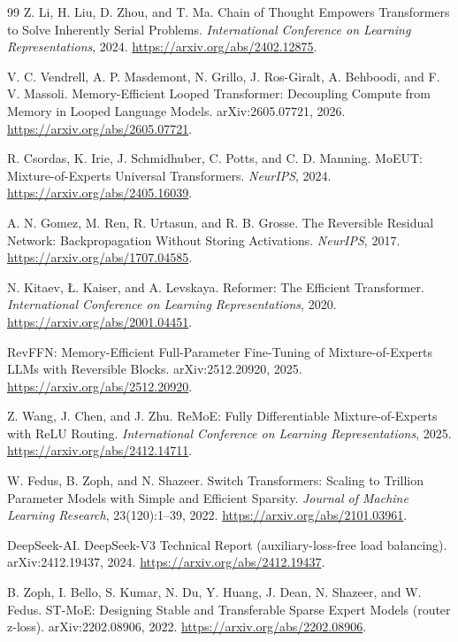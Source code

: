 \documentclass[11pt]{article}
\begin{document}
\begin{thebibliography}{99}
Z. Li, H. Liu, D. Zhou, and T. Ma.
\newblock Chain of Thought Empowers Transformers to Solve Inherently Serial Problems.
\newblock \emph{International Conference on Learning Representations}, 2024.
\newblock \url{https://arxiv.org/abs/2402.12875}.

V. C. Vendrell, A. P. Masdemont, N. Grillo, J. Ros-Giralt, A. Behboodi, and
F. V. Massoli.
\newblock Memory-Efficient Looped Transformer: Decoupling Compute from Memory in Looped Language Models.
\newblock arXiv:2605.07721, 2026.
\newblock \url{https://arxiv.org/abs/2605.07721}.

R. Csordas, K. Irie, J. Schmidhuber, C. Potts, and C. D. Manning.
\newblock MoEUT: Mixture-of-Experts Universal Transformers.
\newblock \emph{NeurIPS}, 2024.
\newblock \url{https://arxiv.org/abs/2405.16039}.

A. N. Gomez, M. Ren, R. Urtasun, and R. B. Grosse.
\newblock The Reversible Residual Network: Backpropagation Without Storing Activations.
\newblock \emph{NeurIPS}, 2017.
\newblock \url{https://arxiv.org/abs/1707.04585}.

N. Kitaev, {\L}. Kaiser, and A. Levskaya.
\newblock Reformer: The Efficient Transformer.
\newblock \emph{International Conference on Learning Representations}, 2020.
\newblock \url{https://arxiv.org/abs/2001.04451}.

RevFFN: Memory-Efficient Full-Parameter Fine-Tuning of Mixture-of-Experts LLMs with Reversible Blocks.
\newblock arXiv:2512.20920, 2025.
\newblock \url{https://arxiv.org/abs/2512.20920}.

Z. Wang, J. Chen, and J. Zhu.
\newblock ReMoE: Fully Differentiable Mixture-of-Experts with ReLU Routing.
\newblock \emph{International Conference on Learning Representations}, 2025.
\newblock \url{https://arxiv.org/abs/2412.14711}.

W. Fedus, B. Zoph, and N. Shazeer.
\newblock Switch Transformers: Scaling to Trillion Parameter Models with Simple and Efficient Sparsity.
\newblock \emph{Journal of Machine Learning Research}, 23(120):1--39, 2022.
\newblock \url{https://arxiv.org/abs/2101.03961}.

DeepSeek-AI.
\newblock DeepSeek-V3 Technical Report (auxiliary-loss-free load balancing).
\newblock arXiv:2412.19437, 2024.
\newblock \url{https://arxiv.org/abs/2412.19437}.

B. Zoph, I. Bello, S. Kumar, N. Du, Y. Huang, J. Dean, N. Shazeer, and W. Fedus.
\newblock ST-MoE: Designing Stable and Transferable Sparse Expert Models (router z-loss).
\newblock arXiv:2202.08906, 2022.
\newblock \url{https://arxiv.org/abs/2202.08906}.


\end{thebibliography}
\end{document}
